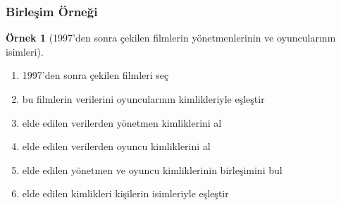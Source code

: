 \documentclass[dvipsnames]{beamer}
\theoremstyle{definition}
\theoremstyle{example}
\newtheorem{ornek}[theorem]{Örnek}
\theoremstyle{plain}
\begin{document}
\begin{frame}
  \frametitle{Birleşim Örneği}

  \begin{ornek}[1997'den sonra çekilen filmlerin yönetmenlerinin ve
                oyuncularının isimleri]
    \pause
    \begin{enumerate}
      \item 1997'den sonra çekilen filmleri seç

      \pause
      \item bu filmlerin verilerini oyuncularının kimlikleriyle eşleştir

      \pause
      \item elde edilen verilerden yönetmen kimliklerini al

      \pause
      \item elde edilen verilerden oyuncu kimliklerini al

      \pause
      \item elde edilen yönetmen ve oyuncu kimliklerinin birleşimini bul

      \pause
      \item elde edilen kimlikleri kişilerin isimleriyle eşleştir
    \end{enumerate}
  \end{ornek}
\end{frame}
\end{document}
